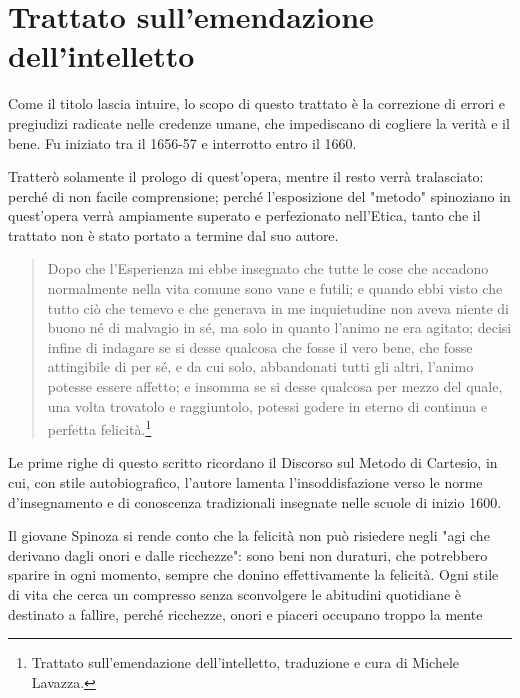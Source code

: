 \chapter{Trattato sull'emendazione dell'intelletto}

\bigskip
\bigskip
\bigskip

Come il titolo lascia intuire, lo scopo di questo trattato è la correzione di errori e pregiudizi radicate nelle credenze umane, che impediscano di cogliere la verità e il bene. Fu iniziato tra il 1656-57 e interrotto entro il 1660.

Tratterò solamente il prologo di quest'opera, mentre il resto verrà tralasciato: perché di non facile comprensione; perché l'esposizione del "metodo" spinoziano in quest'opera verrà ampiamente superato  e perfezionato nell'Etica, tanto che il trattato non è stato portato a termine dal suo autore.

\begin{quotation}
	\small Dopo che l'Esperienza mi ebbe insegnato che tutte le cose che accadono normalmente nella vita
	comune sono vane e futili; e quando ebbi visto che tutto ciò che temevo e che generava in me
	inquietudine non aveva niente di buono né di malvagio in sé, ma solo in quanto l'animo ne era
	agitato; decisi infine di indagare se si desse qualcosa che fosse il vero bene, che fosse attingibile di
	per sé, e da cui solo, abbandonati tutti gli altri, l'animo potesse essere affetto; e insomma se si desse
	qualcosa per mezzo del quale, una volta trovatolo e raggiuntolo, potessi godere in eterno di continua
	e perfetta felicità.\footnote{Trattato sull'emendazione dell'intelletto, traduzione e cura di Michele Lavazza.}
\end{quotation}

Le prime righe di questo scritto ricordano il Discorso sul Metodo di Cartesio, in cui, con stile autobiografico, l'autore lamenta l'insoddisfazione verso le norme d'insegnamento e di conoscenza tradizionali insegnate nelle scuole di inizio 1600.

Il giovane Spinoza si rende conto che la felicità non può risiedere negli "agi che derivano dagli
onori e dalle ricchezze": sono beni non duraturi, che potrebbero sparire in ogni momento, sempre che donino effettivamente la felicità. Ogni stile di vita che cerca un compresso senza sconvolgere le abitudini quotidiane è destinato a fallire, perché ricchezze, onori e piaceri occupano troppo la mente

